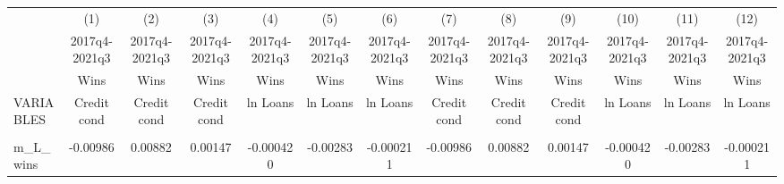 \documentclass[]{article}
\begin{document}
\begin{center}
\begin{tabular}{lcccccccccccc} \hline
 & (1) & (2) & (3) & (4) & (5) & (6) & (7) & (8) & (9) & (10) & (11) & (12) \\
 & 2017q4-2021q3 & 2017q4-2021q3 & 2017q4-2021q3 & 2017q4-2021q3 & 2017q4-2021q3 & 2017q4-2021q3 & 2017q4-2021q3 & 2017q4-2021q3 & 2017q4-2021q3 & 2017q4-2021q3 & 2017q4-2021q3 & 2017q4-2021q3 \\
 & Wins & Wins & Wins & Wins & Wins & Wins & Wins & Wins & Wins & Wins & Wins & Wins \\
VARIABLES & Credit cond & Credit cond & Credit cond & ln Loans & ln Loans & ln Loans & Credit cond & Credit cond & Credit cond & ln Loans & ln Loans & ln Loans \\ \hline
\vspace{4pt} & \begin{footnotesize}\end{footnotesize} & \begin{footnotesize}\end{footnotesize} & \begin{footnotesize}\end{footnotesize} & \begin{footnotesize}\end{footnotesize} & \begin{footnotesize}\end{footnotesize} & \begin{footnotesize}\end{footnotesize} & \begin{footnotesize}\end{footnotesize} & \begin{footnotesize}\end{footnotesize} & \begin{footnotesize}\end{footnotesize} & \begin{footnotesize}\end{footnotesize} & \begin{footnotesize}\end{footnotesize} & \begin{footnotesize}\end{footnotesize} \\
m\_L\_wins & -0.00986 & 0.00882 & 0.00147 & -0.000420 & -0.00283 & -0.000211 & -0.00986 & 0.00882 & 0.00147 & -0.000420 & -0.00283 & -0.000211 \\

\end{tabular}
\end{center}
\end{document}
